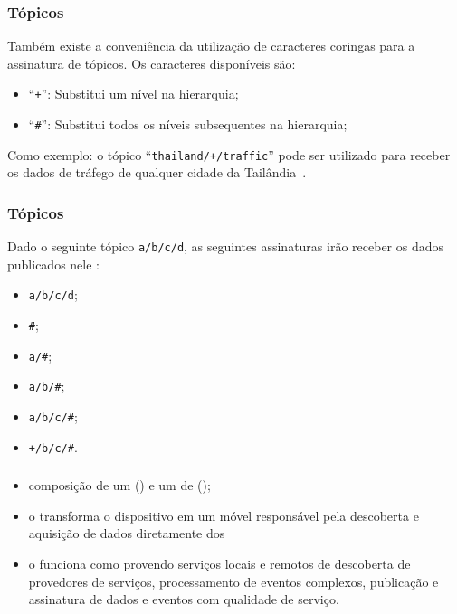 \documentclass[aspectratio=169]{beamer}
\begin{document}
\begin{frame}
	\frametitle{Tópicos \mqtt}
	Também existe a conveniência da utilização de caracteres coringas para a assinatura de tópicos.
	Os caracteres disponíveis são:
	\begin{itemize}
		\item ``\texttt{+}'': Substitui um nível na hierarquia;
		\item ``\texttt{\#}'': Substitui todos os níveis subsequentes na hierarquia;
	\end{itemize}
	
	Como exemplo: o tópico ``\texttt{thailand/+/traffic}'' pode ser utilizado para receber os dados de tráfego de qualquer cidade da Tailândia~\cite{hunkeler:truong:stanford-clark:2008}.
\end{frame}

\begin{frame}
	\frametitle{Tópicos \mqtt}
	Dado o seguinte tópico \texttt{a/b/c/d}, as seguintes assinaturas irão receber os dados publicados nele \cite{light:mosquitto}:
	\begin{itemize}
		\item \texttt{a/b/c/d};
		\item \texttt{\#};
		\item \texttt{a/\#};
		\item \texttt{a/b/\#};
		\item \texttt{a/b/c/\#};
		\item \texttt{+/b/c/\#}.
	\end{itemize}

	
\end{frame}

\begin{frame}
	\frametitle{\mhubcddl}
	\begin{itemize}
		\item composição de um \gateway (\mhub) e um \middleware de \iomt (\cddl);
			
		\item o \mhub transforma o dispositivo \android em um \gateway \iot móvel responsável pela descoberta e aquisição de dados diretamente dos \smartobjs
			
		\item o \cddl funciona como \middleware provendo serviços locais e remotos de descoberta de provedores de serviços, processamento de eventos complexos, publicação e assinatura de dados e eventos com qualidade de serviço.
	\end{itemize}
\end{frame}
\end{document}

